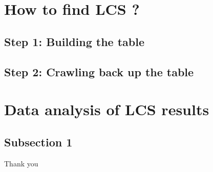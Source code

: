 \documentclass{beamer}
\begin{document}
\section{How to find LCS ?}
\subsection{Step 1: Building the table}
\begin{frame}
\end{frame}

\subsection{Step 2: Crawling back up the table}
\begin{frame}
\end{frame}

\section{Data analysis of LCS results}
\subsection{Subsection 1}

\begin{frame}
\end{frame}

\begin{frame}[standout]
  Thank you
\end{frame}
\end{document}
